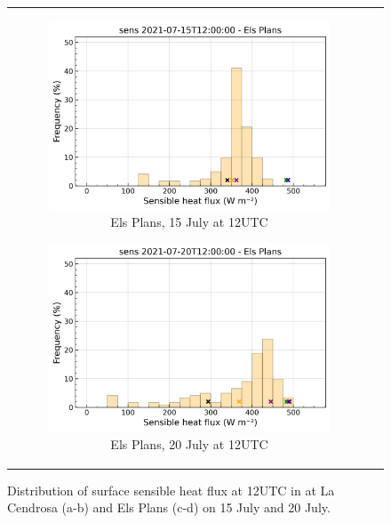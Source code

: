 \begin{figure}[hbtp]
{\begin{tabular}{cc}
\begin{subfigure}[t]{0.48\textwidth}
            \caption{Els Plans, 15 July at 12UTC}
            \includegraphics[width=\textwidth]{images/chap5/IOP_bins/bins_sens_2021-07-15T12:00:00_elsplans.png}
        \end{subfigure}
        \begin{subfigure}[t]{0.48\textwidth}
            \caption{Els Plans, 20 July at 12UTC}
            \includegraphics[width=\textwidth]{images/chap5/IOP_bins/bins_sens_2021-07-20T12:00:00_elsplans.png}
        \end{subfigure}
    \end{tabular}
    }
    \caption{Distribution of surface sensible heat flux at 12UTC in \mesomean at La Cendrosa (a-b) and Els Plans (c-d) on 15 July and 20 July.}
    \label{fig:sens_bins}
\end{figure}

